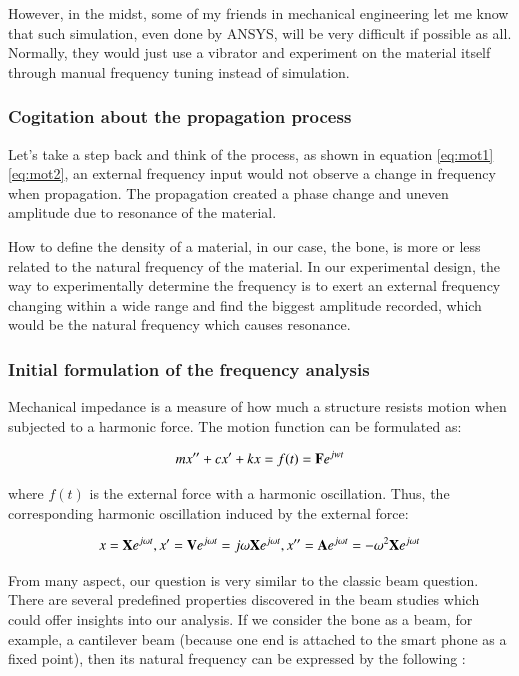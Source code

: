 \documentclass{sigchi}
\begin{document}
However, in the midst, some of my friends in mechanical engineering let me know that such simulation, even done by ANSYS, will be very difficult if possible as all. Normally, they would just use a vibrator and experiment on the material itself through manual frequency tuning instead of simulation. 

\subsubsection{Cogitation about the propagation process} 

Let's take a step back and think of the process, as shown in equation \eqref{eq:mot1}\eqref{eq:mot2}, an external frequency input would not observe a change in frequency when propagation. The propagation created a phase change and uneven amplitude due to resonance of the material. 

How to define the density of a material, in our case, the bone, is more or less related to the natural frequency of the material. In our experimental design, the way to experimentally determine the frequency is to exert an external frequency changing within a wide range and find the biggest amplitude recorded, which would be the natural frequency which causes resonance.  

\subsubsection{Initial formulation of the frequency analysis} 

Mechanical impedance is a measure of how much a structure resists motion when subjected to a harmonic force. The motion function can be formulated as:

\begin{equation} \label{eq:mot1}
mx''+cx'+kx=f(t)={\bf F}e^{jwt}
\end{equation}

where $f(t)$ is the external force with a harmonic oscillation. Thus, the corresponding harmonic oscillation induced by the external force: 

\begin{equation} \label{eq:mot2}
x={\bf X}e^{j\omega t}, x'={\bf V}e^{j \omega t}=j\omega{\bf X}e^{j\omega t}, x''={\bf A}e^{j \omega t}=-\omega^2{\bf X}e^{j \omega t}
\end{equation}

From many aspect, our question is very similar to the classic beam question. There are several predefined properties discovered in the beam studies which could offer insights into our analysis. If we consider the bone as a beam, for example, a cantilever beam (because one end is attached to the smart phone as a fixed point), then its natural frequency can be expressed by the following \cite{Young:2002:formula}:
\end{document}
